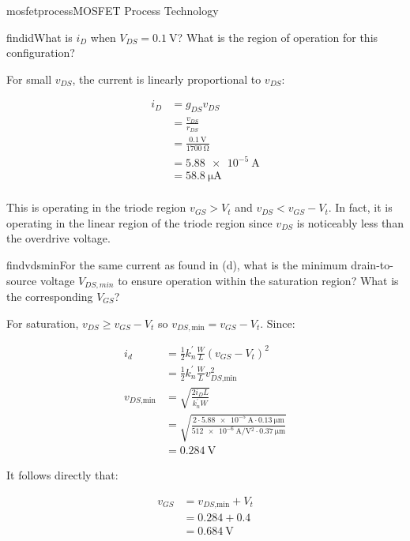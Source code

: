 \begin{mainquestion}{mosfetprocess}{MOSFET Process Technology}
\begin{partquestion}{findid}{What is $i_{D}$ when $V_{DS} = \qty{0.1}{\volt}$? What is the region of operation for this configuration?}
\begin{answer}
For small $v_{DS}$, the current is linearly proportional to $v_{DS}$:

\begin{align*}
    i_D &= g_{DS} v_{DS} \\
    &= \frac{v_{DS}}{r_{DS}} \\
    &= \frac{\qty{0.1}{\volt}}{\qty{1700}{\ohm}} \\
    &= \qty{5.88e-5}{\ampere} \\
    &= \qty{58.8}{\micro\ampere} \\
\end{align*}

This is operating in the triode region $v_{GS} > V_{t}$ and $v_{DS} < v_{GS} - V_{t}$. In fact, it is operating in the linear region of the triode region since $v_{DS}$ is noticeably less than the overdrive voltage.
\end{answer}
\end{partquestion}

\begin{partquestion}{findvdsmin}{For the same current as found in (d), what is the minimum drain-to-source voltage $V_{DS,min}$ to ensure operation within the saturation region? What is the corresponding $V_{GS}$?}
\begin{answer}
For saturation, $v_{DS} \geq v_{GS} - V_{t}$ so $v_{DS,\text{min}} = v_{GS} - V_{t}$. Since:

\begin{align*}
    i_d &= \frac{1}{2} k^{'}_n \frac{W}{L} (v_{GS}-V_t)^2 \\
    &= \frac{1}{2} k^{'}_n \frac{W}{L} v^2_{DS\text{,min}} \\
    v_{DS\text{,min}} &= \sqrt{\frac{2 i_D L}{k^{'}_n W}} \\
    &= \sqrt{\frac{2 \cdot \qty{5.88e-5}{\ampere} \cdot \qty{0.13}{\micro\meter}}{\qty{512e-6}{\ampere/\volt^2}  \cdot\qty{0.37}{\micro\meter}}} \\
    &= \qty{0.284}{\volt}
\end{align*}

It follows directly that:

\begin{align*}
    v_{GS} &= v_{DS\text{,min}} + V_t \\
    &= 0.284 + 0.4 \\
    &= \qty{0.684}{\volt}
\end{align*}

\end{answer}
\end{partquestion}

\end{mainquestion}
